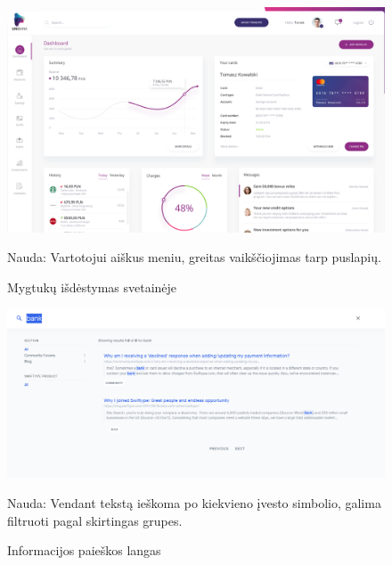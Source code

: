 \documentclass{VUMIFPSkursinis}
\begin{document}
\begin{figure}[!htb]
  \includegraphics[width=\linewidth]{iconPlacement.png}
  \caption{Mygtukų išdėstymas svetainėje}
	\label{fig:iconPlacement}
	Nauda: Vartotojui aiškus meniu, greitas vaikščiojimas tarp puslapių.
\end{figure}
\begin{figure}[!htb]
  \includegraphics[width=\linewidth]{SearchWindow.png}
  \caption{Informacijos paieškos langas}
	\label{fig:searchWindow}
	Nauda: Vendant tekstą ieškoma po kiekvieno įvesto simbolio, galima filtruoti pagal skirtingas grupes.
\end{figure}
\end{document}
